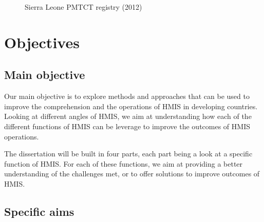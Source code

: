 \documentclass[a4paper,11pt,final,twoside]{article}
\begin{document}
\begin{figure}[ht]
\begin{center}
\caption{Sierra Leone PMTCT registry (2012)}
\end{center}
\end{figure}

\section{Objectives}

	\subsection{Main objective}

Our main objective is to explore methods and approaches that can be used to improve the comprehension and the operations of HMIS in developing countries. Looking at different angles of HMIS, we aim at understanding how each of the different functions of HMIS can be leverage to improve the outcomes of HMIS operations.

The dissertation will be built in four parts, each part being a look at a specific function of HMIS. For each of these functions, we aim at providing a better understanding of the challenges met, or to offer solutions to improve outcomes of HMIS.

    \subsection{Specific aims}
\end{document}
